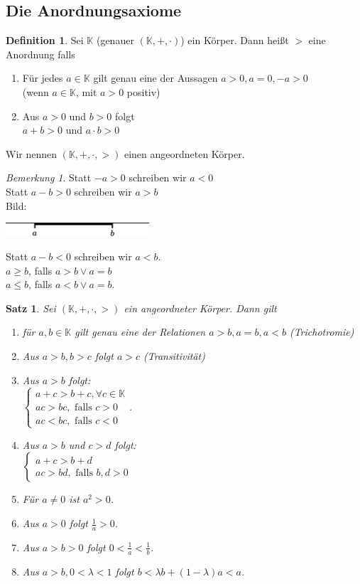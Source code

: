 \documentclass[12pt,a4paper,titlepage]{article} %
\newtheorem{satz}{Satz}[subsection]
\theoremstyle{definition}
\newtheorem{defi}{Definition}[subsection]
\theoremstyle{remark}
\newtheorem*{bem}{Bemerkung}
\begin{document}
\subsection{Die Anordnungsaxiome}
\begin{defi}
	Sei $\mathbb{K}$ (genauer $(\mathbb{K},+,\cdot)$) ein Körper. Dann heißt $>$ eine Anordnung falls
	\begin{enumerate}
		\item Für jedes $a\in\mathbb{K}$ gilt genau eine der Aussagen $a>0,a=0,-a>0$\\
		(wenn $a\in\mathbb{K}$, mit $a>0$ positiv)
		\item Aus $a>0$ und $b>0$ folgt\\
		$a+b>0$ und $a\cdot b>0$
	\end{enumerate}
	Wir nennen $(\mathbb{K},+,\cdot,>)$ einen angeordneten Körper.
\end{defi}
\begin{bem}
	Statt $-a>0$ schreiben wir $a<0$\\
	Statt $a-b>0$ schreiben wir $a>b$\\
	Bild:
	\begin{center}
		\includegraphics[width=0.4\textwidth]{images/img02.png}
	\end{center}
	Statt $a-b<0$ schreiben wir $a<b$.\\
	$a \geq b$, falls $a>b \vee a=b$\\
	$a \leq b$, falls $a<b \vee a=b$.
\end{bem}
\begin{satz}
	Sei $(\mathbb{K}, +,\cdot, >)$ ein angeordneter Körper. Dann gilt
	\begin{enumerate}
		\item für $a,b\in\mathbb{K}$ gilt genau eine der Relationen $a>b, a=b, a<b$ (Trichotromie)
		\item Aus $a>b, b>c$ folgt $a>c$ (Transitivität)
		\item Aus $a>b$ folgt:\\
		$\begin{cases}
			a+c>b+c, \forall c\in\mathbb{K}\\
			ac>bc, \text{ falls } c>0\\
			ac<bc, \text{ falls } c<0
		\end{cases}$.
		\item Aus $a>b$ und $c>d$ folgt:\\
		$\begin{cases}
			a+c>b+d\\
			ac>bd, \text{ falls } b,d>0 %
		\end{cases}$
		\item Für $a\neq 0$ ist $a^2 >0$.
		\item Aus $a>0$ folgt $\frac{1}{a}>0$.
		\item Aus $a>b>0$ folgt $0<\frac{1}{a}<\frac{1}{b}$.
		\item Aus $a>b, 0<\lambda<1$ folgt $b<\lambda b + (1-\lambda)a<a$.
	\end{enumerate}
\end{satz}
\end{document}

